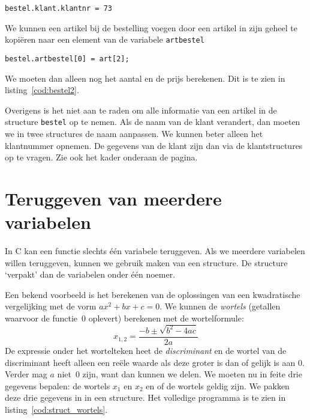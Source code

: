 \hspace*{1em}\texttt{bestel.klant.klantnr = 73}

We kunnen een artikel bij de bestelling voegen door een artikel in zijn geheel te kopiëren naar een element van de variabele \texttt{artbestel}

\hspace*{1em}\texttt{bestel.artbestel[0] = art[2];}

We moeten dan alleen nog het aantal en de prijs berekenen. Dit is te zien in listing~\ref{cod:bestel2}.


Overigens is het niet aan te raden om alle informatie van een artikel in de structure \texttt{bestel} op te nemen. Als de naam van de klant verandert, dan moeten we in twee structures de naam aanpassen. We kunnen beter alleen het klantnummer opnemen. De gegevens van de klant zijn dan via de klantstructures op te vragen. Zie ook het kader onderaan de pagina.


\section{Teruggeven van meerdere variabelen}
In C kan een functie slechts één variabele teruggeven. Als we meerdere variabelen willen teruggeven, kunnen we gebruik maken van een structure. De structure `verpakt' dan de variabelen onder één noemer.

Een bekend voorbeeld is het berekenen van de oplossingen van een kwadratische vergelijking met de vorm $ax^2+bx+c=0$. We kunnen de \textsl{wortels} (getallen waarvoor de functie~0 oplevert) berekenen met de wortelformule:
%
\begin{equation}
x_{1,2} = \dfrac{-b\pm\sqrt{b^2-4ac}}{2a}
\end{equation}
%
De expressie onder het wortelteken heet de \textsl{discriminant} en de wortel van de discriminant heeft alleen een reële waarde als deze groter is dan of gelijk is aan 0. Verder mag $a$ niet~0 zijn, want dan kunnen we delen. We moeten nu in feite drie gegevens bepalen: de wortels $x_1$ en $x_2$ en of de wortels geldig zijn. We pakken deze drie gegevens in in een structure. Het volledige programma is te zien in listing~\ref{cod:struct_wortels}.


